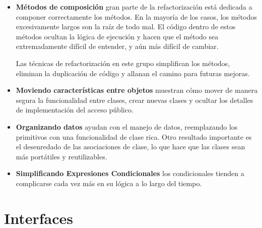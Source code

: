 \begin{itemize}
	\item \textbf{Métodos de composición} gran parte de la refactorización está dedicada a componer correctamente los métodos. En la mayoría de los casos, los métodos excesivamente largos son la raíz de todo mal. El código dentro de estos métodos ocultan la lógica de ejecución y hacen que el método sea extremadamente difícil de entender, y aún más difícil de cambiar.
	
	Las técnicas de refactorización en este grupo simplifican los métodos, eliminan la duplicación de código y allanan el camino para futuras mejoras.
	\item \textbf{Moviendo características entre objetos} muestran cómo mover de manera segura la funcionalidad entre clases, crear nuevas clases y ocultar los detalles de implementación del acceso público.
	\item\textbf{ Organizando datos} ayudan con el manejo de datos, reemplazando los primitivos con una funcionalidad de clase rica. Otro resultado importante es el desenredado de las asociaciones de clase, lo que hace que las clases sean más portátiles y reutilizables.
	\item \textbf{Simplificando Expresiones Condicionales} los condicionales tienden a complicarse cada vez más en su lógica a lo largo del tiempo.
\end{itemize}


\section{Interfaces}



